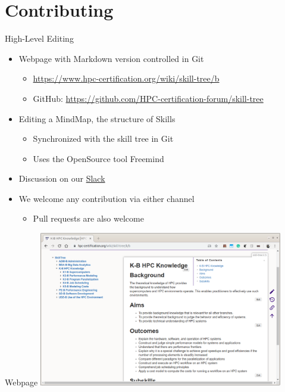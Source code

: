 \documentclass[compress,aspectratio=169]{beamer}
\begin{document}
\section{Contributing}

\begin{frame}{High-Level Editing}
  \begin{itemize}
    \item Webpage with Markdown version controlled in Git
      \begin{itemize}
        \item \url{https://www.hpc-certification.org/wiki/skill-tree/b}
        \item GitHub: \url{https://github.com/HPC-certification-forum/skill-tree}
      \end{itemize}
    \item Editing a MindMap, the structure of Skills
      \begin{itemize}
        \item Synchronized with the skill tree in Git
        \item Uses the OpenSource tool Freemind
      \end{itemize}
    \item Discussion on our \href{https://join.slack.com/t/hpc-certification/shared_invite/enQtMzUwNzU3NzM2MTkzLTAzZWM3NDg0N2I2ZmQwOWI5ZGUwNjNlNDgzM2RmOTM3ZWRjNjIxYTc5NzUxYTJhNmRlNmM5YmE1NDY3YzkzYzA}{Slack}
    \item We welcome any contribution via either channel
      \begin{itemize}
        \item Pull requests are also welcome
      \end{itemize}
  \end{itemize}
\end{frame}

\begin{frame}{Webpage}
  \includegraphics[width=0.8\textwidth]{www}
\end{frame}
\end{document}
